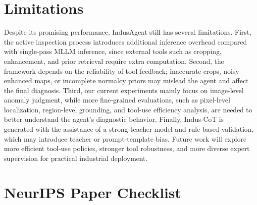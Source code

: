 \documentclass{llmxive}
\providecommand{\answerYes}[1][]{[Yes]#1}
\providecommand{\answerNo}[1][]{[No]#1}
\providecommand{\answerNA}[1][]{[N/A]#1}
\begin{document}
{\section{Limitations}
\label{sec:limitations}

Despite its promising performance, IndusAgent still has several limitations. First, the active inspection process introduces additional inference overhead compared with single-pass MLLM inference, since external tools such as cropping, enhancement, and prior retrieval require extra computation. Second, the framework depends on the reliability of tool feedback; inaccurate crops, noisy enhanced maps, or incomplete normalcy priors may mislead the agent and affect the final diagnosis. Third, our current experiments mainly focus on image-level anomaly judgment, while more fine-grained evaluations, such as pixel-level localization, region-level grounding, and tool-use efficiency analysis, are needed to better understand the agent's diagnostic behavior. Finally, Indus-CoT is generated with the assistance of a strong teacher model and rule-based validation, which may introduce teacher or prompt-template bias. Future work will explore more efficient tool-use policies, stronger tool robustness, and more diverse expert supervision for practical industrial deployment.






\section*{NeurIPS Paper Checklist}



}
\end{document}
